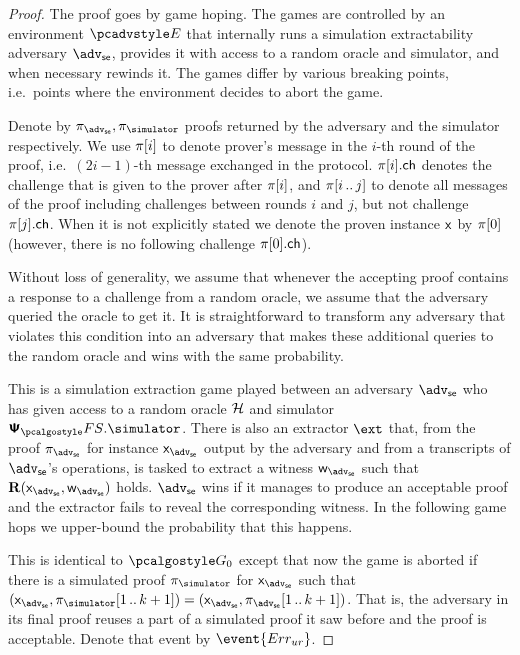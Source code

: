 \let\accentvec\vec \documentclass[runningheads,10pt]{llncs}
\begin{document}
\begin{proof}		
	The proof goes by game hoping. The games are controlled by an environment $\env$ that internally runs a simulation extractability adversary $\advse$,  provides it with access to a random oracle and simulator, and when necessary rewinds it.
	The games differ by various breaking points, i.e.~points where the environment decides to abort the game. 

	Denote by $\zkproof_{\advse}, \zkproof_{\simulator}$ proofs
	returned by the adversary and the simulator respectively. We use $\pi[i]$
	to denote prover's message in the $i$-th round of the proof,
	i.e.~$(2i - 1)$-th message exchanged in the protocol. $\pi[i].\mathsf{ch}$
	denotes the challenge that is given to the prover after $\pi[i]$, and
	$\pi[i \, .. \, j]$ to denote all messages of the proof including
	challenges between rounds $i$ and $j$, but not challenge $\pi[j].\mathsf{ch}$. When it is not explicitly stated we
	denote the proven instance $\mathsf{x}$ by $\pi[0]$ (however, there is no
	following challenge $\pi[0].\mathsf{ch}$).
	
	Without loss of generality, we assume that whenever the accepting proof contains a response to a challenge from a random oracle, we assume that the adversary queried the oracle to get it. 
	It is straightforward to transform any adversary that violates this condition into an adversary that makes these additional queries to the random oracle and wins with the same probability.
	
	This is a simulation extraction game played between an adversary $\advse$ who has given access to a random oracle $\mathcal{H}$ and simulator $\psfs.\simulator$. 
	There is also an extractor $\ext$ that, from the proof $\zkproof_\advse$ for instance $\inp_\advse$ output by the adversary and from a transcripts of $\advse$'s operations, is tasked to extract a witness $\wit_\advse$ such that $\REL(\inp_\advse, \wit_\advse)$ holds.
	$\advse$ wins if it manages to produce an acceptable proof and the extractor fails to reveal the corresponding witness.
	In the following game hops we upper-bound the probability that this happens.
	
	This is identical to $\game{0}$ except that now the game is aborted if there
	is a simulated proof $\zkproof_\simulator$ for $\inp_\advse$ such that
	$(\inp_\advse, \zkproof_\simulator\range{1}{k + 1}) = (\inp_\advse,
	\zkproof_\advse\range{1}{k+ 1})$. That is, the adversary in its final proof reuses a part of a simulated proof it saw before and the proof is acceptable.
	Denote that event by $\event{\errur}$.
	

\end{proof}
\end{document}
